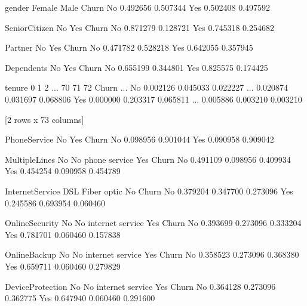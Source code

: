 \documentclass[letterpaper,10pt,english]{jupyterBook}
\begin{document}
\begin{sphinxVerbatim}[commandchars=\\\{\}]
gender    Female      Male
Churn                     
No      0.492656  0.507344
Yes     0.502408  0.497592

SeniorCitizen        No       Yes
Churn                            
No             0.871279  0.128721
Yes            0.745318  0.254682

Partner        No       Yes
Churn                      
No       0.471782  0.528218
Yes      0.642055  0.357945

Dependents        No       Yes
Churn                         
No          0.655199  0.344801
Yes         0.825575  0.174425

tenure        0         1         2   ...        70        71        72
Churn                                 ...                              
No      0.002126  0.045033  0.022227  ...  0.020874  0.031697  0.068806
Yes     0.000000  0.203317  0.065811  ...  0.005886  0.003210  0.003210

[2 rows x 73 columns]

PhoneService        No       Yes
Churn                           
No            0.098956  0.901044
Yes           0.090958  0.909042

MultipleLines        No  No phone service       Yes
Churn                                              
No             0.491109          0.098956  0.409934
Yes            0.454254          0.090958  0.454789

InternetService       DSL  Fiber optic        No
Churn                                           
No               0.379204     0.347700  0.273096
Yes              0.245586     0.693954  0.060460

OnlineSecurity        No  No internet service       Yes
Churn                                                  
No              0.393699             0.273096  0.333204
Yes             0.781701             0.060460  0.157838

OnlineBackup        No  No internet service       Yes
Churn                                                
No            0.358523             0.273096  0.368380
Yes           0.659711             0.060460  0.279829

DeviceProtection        No  No internet service       Yes
Churn                                                    
No                0.364128             0.273096  0.362775
Yes               0.647940             0.060460  0.291600


\end{sphinxVerbatim}
\end{document}
